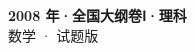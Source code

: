 \documentclass[zihao=-4, a4paper]{ctexart}
\begin{document}
\begin{center}
  {\Large\bfseries 2008 年·全国大纲卷Ⅰ·理科}\\[4pt]
  {\large 数学 · 试题版}
\end{center}
\medskip
{}

\end{document}
